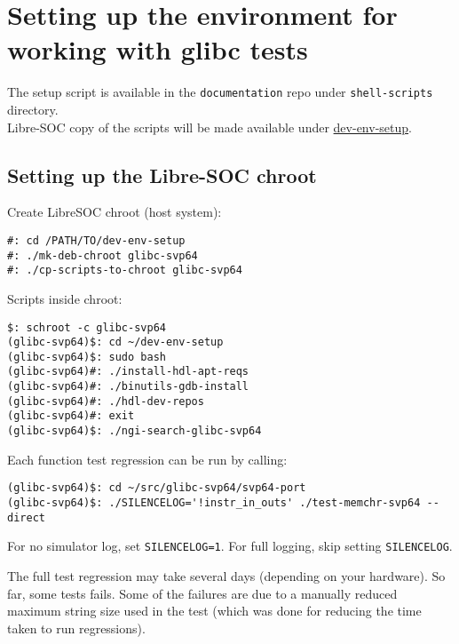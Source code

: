 %

\chapter{Setting up the environment for working with glibc tests}

The setup script is available in the \texttt{documentation} repo
under \texttt{shell-scripts} directory.\\

Libre-SOC copy of the scripts will be made available under
\href{https://git.libre-soc.org/?p=dev-env-setup.git;a=tree}{dev-env-setup}.

\section{Setting up the Libre-SOC chroot}

Create LibreSOC chroot (host system):

\begin{verbatim}
#: cd /PATH/TO/dev-env-setup
#: ./mk-deb-chroot glibc-svp64
#: ./cp-scripts-to-chroot glibc-svp64
\end{verbatim}

Scripts inside chroot:

\begin{verbatim}
$: schroot -c glibc-svp64
(glibc-svp64)$: cd ~/dev-env-setup
(glibc-svp64)$: sudo bash
(glibc-svp64)#: ./install-hdl-apt-reqs
(glibc-svp64)#: ./binutils-gdb-install
(glibc-svp64)#: ./hdl-dev-repos
(glibc-svp64)#: exit
(glibc-svp64)$: ./ngi-search-glibc-svp64
\end{verbatim}

Each function test regression can be run by calling:

\begin{verbatim}
(glibc-svp64)$: cd ~/src/glibc-svp64/svp64-port
(glibc-svp64)$: ./SILENCELOG='!instr_in_outs' ./test-memchr-svp64 --direct
\end{verbatim}

For no simulator log, set \texttt{SILENCELOG=1}.
For full logging, skip setting \texttt{SILENCELOG}.

The full test regression may take several days (depending on your hardware).
So far, some tests fails. Some of the failures are due to a manually reduced
maximum string size used in the test (which was done for reducing the time
taken to run regressions).\\

